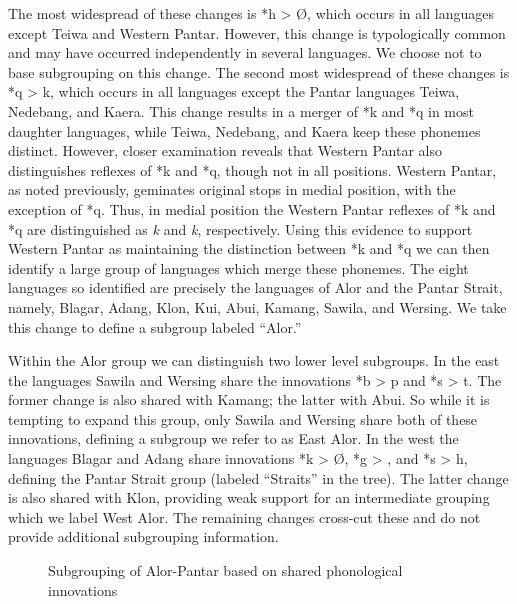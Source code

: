 The most widespread of these changes is *h {\textgreater} {\O}, which occurs in all languages except Teiwa and Western Pantar. However, this change is typologically common and may have occurred independently in several languages. We choose not to base subgrouping on this change. The second most widespread of these changes is *q {\textgreater} k, which occurs in all languages except the Pantar languages Teiwa, Nedebang, and Kaera. This change results in a merger of *k and *q in most daughter languages, while Teiwa, Nedebang, and Kaera keep these phonemes distinct. However, closer examination reveals that Western Pantar also distinguishes reflexes of *k and *q, though not in all positions. Western Pantar, as noted previously, geminates original stops in medial position, with the exception of *q. Thus, in medial position the Western Pantar reflexes of *k and *q are distinguished as \textit{k{\textlengthmark}} and \textit{k}, respectively. Using this evidence to support Western Pantar as maintaining the
distinction between *k and *q we can then identify a large group of languages which merge these phonemes. The eight languages so identified are precisely the languages of Alor and the Pantar Strait, namely, Blagar, Adang, Klon, Kui, Abui, Kamang, Sawila, and Wersing. We take this change to define a subgroup labeled ``Alor.''

Within the Alor group we can distinguish two lower level subgroups. In the east the languages Sawila and Wersing share the innovations *b {\textgreater} p and *s {\textgreater} t. The former change is also shared with Kamang; the latter with Abui. So while it is tempting to expand this group, only Sawila and Wersing share both of these innovations, defining a subgroup we refer to as East Alor. In the west the languages Blagar and Adang share innovations *k {\textgreater} {\O}, *g {\textgreater} {\textglotstop}, and *s {\textgreater} h, defining the Pantar Strait group (labeled ``Straits'' in the tree). The latter change is also shared with Klon, providing weak support for an intermediate grouping which we label West Alor. The remaining changes cross-cut these and do not provide additional subgrouping information.

\begin{figure}
\caption{Subgrouping of Alor-Pantar based on shared phonological innovations}
\label{bkm:Ref214279128}
\end{figure}


